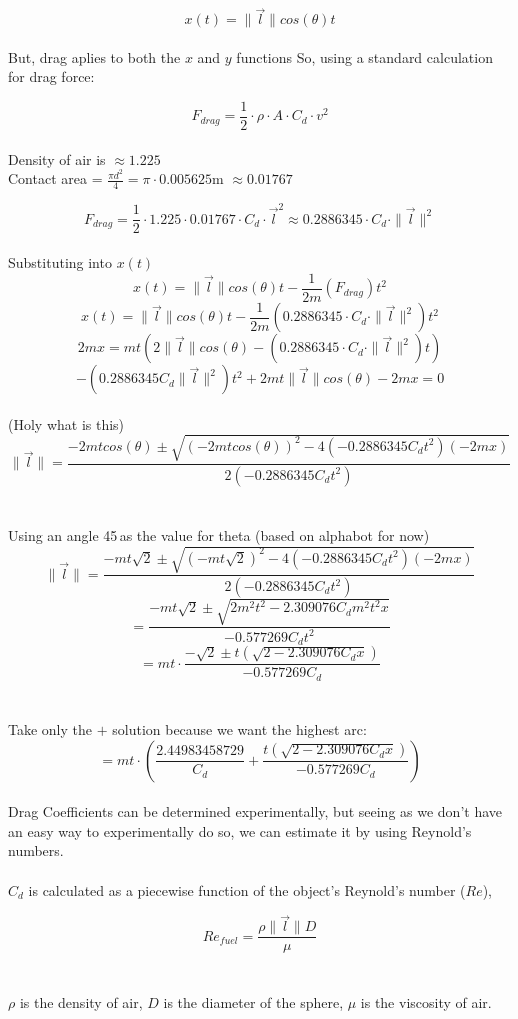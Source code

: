 \documentclass{article}
\begin{document}
\[x(t) = \|\vec{l}\|cos(\theta) t\]
\\
But, drag aplies to both the $x$ and $y$ functions
So, using a standard calculation for drag force:

\[F_{drag} = \frac{1}{2} \cdot \rho \cdot A \cdot C_d \cdot v^2\]
\\
Density of air is $\approx{1.225}$\\
Contact area = $\frac{\pi d^2}{4} = \pi \cdot 0.005625$m $\approx 0.01767$




\[F_{drag} = \frac{1}{2} \cdot 1.225 \cdot 0.01767 \cdot C_d \cdot \vec{l}^2 \approx 0.2886345 \cdot C_d \cdot \|\vec{l}\|^2\]
\\
Substituting into $x(t)$
\[x(t) = \|\vec{l}\|cos(\theta) t - \frac{1}{2m}(F_{drag})t^2\]
\[x(t) = \|\vec{l}\|cos(\theta) t - \frac{1}{2m}(0.2886345 \cdot C_d \cdot \|\vec{l}\|^2)t^2\]
\[2mx = mt(2\|\vec{l}\|cos(\theta) - (0.2886345 \cdot C_d \cdot \|\vec{l}\|^2)t)\]
\[-(0.2886345C_d\|\vec{l}\|^2)t^2+2mt\|\vec{l}\|cos(\theta)-2mx = 0\]
\\(Holy what is this)
\[\|\vec{l}\| = \frac{-2mtcos(\theta) \pm \sqrt{(-2mtcos(\theta))^2 - 4(-0.2886345C_dt^2)(-2mx)}}{2(-0.2886345C_dt^2)}  \]
\\
\\
Using an angle 45\textdegree \,as the value for theta (based on alphabot for now)
\[\|\vec{l}\| = \frac{-mt\sqrt{2} \pm \sqrt{(-mt\sqrt{2})^2 - 4(-0.2886345C_dt^2)(-2mx)}}{2(-0.2886345C_dt^2)}\]
\[ = \frac{-mt\sqrt{2} \pm \sqrt{2m^2t^2 - 2.309076C_dm^2t^2x}}{-0.577269C_dt^2}\]
\[ = mt \cdot \frac{-\sqrt{2} \pm t(\sqrt{2 - 2.309076C_dx})}{-0.577269C_d}\]
\\\\
Take only the $+$ solution because we want the highest arc:
\[ = mt \cdot (\frac{2.44983458729}{C_d} + \frac{t(\sqrt{2 - 2.309076C_dx})}{-0.577269C_d})\]
\\
Drag Coefficients can be determined experimentally, but seeing as we don't have an easy way to experimentally do so, we can estimate it by using Reynold's numbers. 
\\\\
$C_d$ is calculated as a piecewise function of the object's Reynold's number ($Re$), 

\[Re_{fuel} = \frac{\rho\|\vec{l}\|D}{\mu}\]
\\\\
$\rho$ is the density of air, $D$ is the diameter of the sphere, $\mu$ is the viscosity of air.
\end{document}
